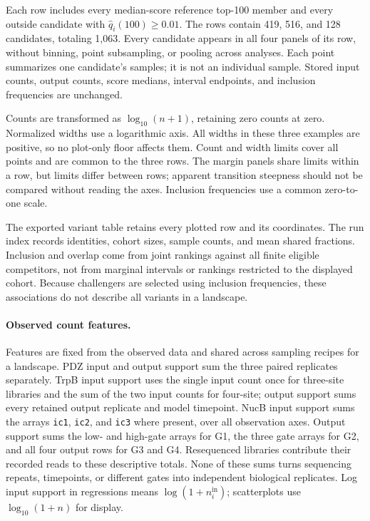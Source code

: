 Each row includes every median-score reference top-100 member and
every outside candidate with $\hat q_i(100)\geq0.01$. The rows contain
419, 516, and 128 candidates, totaling 1,063. Every candidate appears in
all four panels of its row, without binning, point subsampling, or
pooling across analyses. Each point summarizes one candidate's samples;
it is not an individual sample. Stored input counts, output counts,
score medians, interval endpoints, and inclusion frequencies are unchanged.

Counts are transformed as $\log_{10}(n+1)$, retaining zero counts at zero.
Normalized widths use a logarithmic axis. All widths in these three
examples are positive, so no plot-only floor affects them. Count and
width limits cover all points and are common to the three rows. The
margin panels share limits within a row, but limits differ between
rows; apparent transition steepness should not be compared without
reading the axes. Inclusion frequencies use a common zero-to-one scale.

The exported variant table retains every plotted row and its coordinates.
The run index records identities, cohort sizes, sample counts, and mean
shared fractions. Inclusion and overlap come from joint rankings against
all finite eligible competitors, not from marginal intervals or rankings
restricted to the displayed cohort. Because challengers are selected
using inclusion frequencies, these associations do not describe all
variants in a landscape.

\paragraph{Observed count features.}
\label{app:count-features}
Features are fixed from the observed data and shared across sampling
recipes for a landscape. PDZ input and output support sum the three
paired replicates separately. TrpB input support uses the single input
count once for three-site libraries and the sum of the two input counts
for four-site; output support sums every retained output replicate and
model timepoint. NucB input support sums the arrays \texttt{ic1},
\texttt{ic2}, and \texttt{ic3} where present, over all observation axes.
Output support sums the low- and high-gate arrays for G1, the three
gate arrays for G2, and all four output rows for G3 and G4. Resequenced
libraries contribute their recorded reads to these descriptive totals.
None of these sums turns sequencing repeats, timepoints, or different
gates into independent biological replicates. Log input support in
regressions means $\log(1+n_i^{\mathrm{in}})$; scatterplots use
$\log_{10}(1+n)$ for display.

